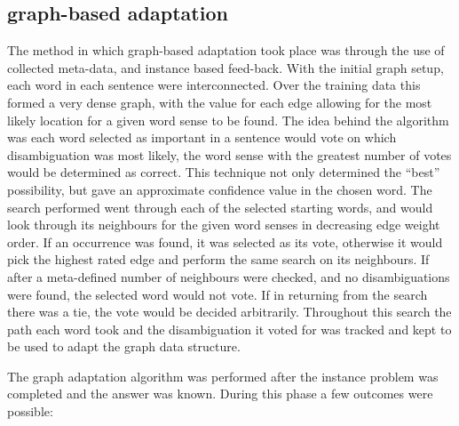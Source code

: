 \subsection{graph-based adaptation}

The method in which graph-based adaptation took place was through the use of
collected meta-data, and instance based feed-back.  With the initial graph
setup, each word in each sentence were interconnected. Over the training data
this formed a very dense graph, with the value for each edge allowing for the
most likely location for a given word sense to be found.  The idea behind the
algorithm was each word selected as important in a sentence would vote on which
disambiguation was most likely, the word sense with the greatest number of votes
would be determined as correct.  This technique not only determined the ``best''
possibility, but gave an approximate confidence value in the chosen word. The
search performed went through each of the selected starting words, and would
look through its neighbours for the given word senses in decreasing edge weight
order. If an occurrence was found, it was selected as its vote, otherwise it
would pick the highest rated edge and perform the same search on its neighbours.
If after a meta-defined number of neighbours were checked, and no
disambiguations were found, the selected word would not vote.  If in returning
from the search there was a tie, the vote would be decided arbitrarily.
Throughout this search the path each word took and the disambiguation it voted
for was tracked and kept to be used to adapt the graph data structure.

The graph adaptation algorithm was performed after the instance problem was
completed and the answer was known.  During this phase a few outcomes were
possible: 

